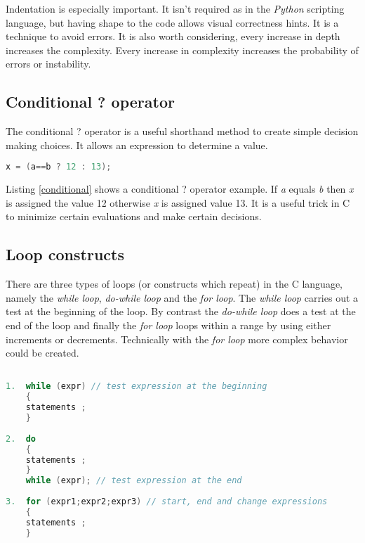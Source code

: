Indentation is especially important. It isn't required as in the \textit{Python} scripting language, but having shape to the code allows visual correctness hints. It is a technique to avoid errors. It is also worth considering, every increase in depth increases the complexity. Every increase in complexity increases the probability of errors or instability.    

\subsection{Conditional ? operator}


The conditional ? operator is a useful shorthand method to create simple decision making choices. It allows an expression to determine a value.

\begin{lstlisting}[language=C,caption={Example conditional ? operator},captionpos=b,label=conditional]
x = (a==b ? 12 : 13);
\end{lstlisting}

Listing \ref{conditional} shows a conditional ? operator example. If \textit{a} equals \textit{b} then \textit{x} is assigned the value 12 otherwise \textit{x} is assigned value 13. It is a useful trick in C to minimize certain evaluations and make certain decisions.

\subsection{Loop constructs} \label{loops} 

There are three types of loops (or constructs which repeat) in the C language, namely the \textit{while loop}, \textit{do-while loop} and the \textit{for loop}. The \textit{while loop} carries out a test at the beginning of the loop. By contrast the \textit{do-while loop} does a test at the end of the loop and finally the \textit{for loop} loops within a range by using either increments or decrements. Technically with the \textit{for loop} more complex behavior could be created. 

\begin{lstlisting}[language=C,caption={Syntax for the 3 loop constructs},captionpos=b,label=3loops]

1.  while (expr) // test expression at the beginning
    {
    statements ;
    }
  
2.  do						 
    {							  
    statements ;				
    }
    while (expr); // test expression at the end
	
3.  for (expr1;expr2;expr3) // start, end and change expressions
    {
    statements ;
    }	
	
\end{lstlisting}

